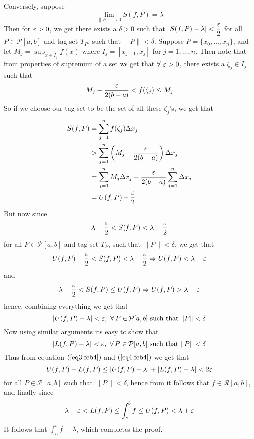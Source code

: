 \begin{prf}
    Conversely, suppose \[ \lim_{\|P\| \to 0} S(f,P) = \lambda \]
    Then for $\varepsilon > 0$, we get there exists a $\delta > 0$ such that $|S(f,P) - \lambda| < \displaystyle{\frac{\varepsilon}{2}}$ for all $P \in \mathcal{P}[a,b]$ and tag set $T_P$, such that $\|P\| < \delta$. Suppose $P = \{x_0, \dots, x_n\}$, and let $M_j = \sup_{x \in I_j} f(x)$ where $I_j = [x_{j-1},x_j]$ for $j = 1, \dots, n$. Then note that from properties of supremum of a set we get that $\forall \ \varepsilon > 0$, there exists a $\zeta_j \in I_j$ such that \[ M_j - \frac{\varepsilon}{2(b-a)} < f(\zeta_j) \leq M_j \] So if we choose our tag set to be the set of all these $\zeta_j$'s, we get that 
    \begin{align*}
        S(f,P) &= \sum_{j=1}^n f(\zeta_j) \Delta x_j \\ 
               &> \sum_{j=1}^n \left(M_j - \frac{\varepsilon}{2(b-a)}\right) \Delta x_j \\ 
               &= \sum_{j=1}^n M_j \Delta x_j - \frac{\varepsilon}{2(b-a)} \sum_{j=1}^n \Delta x_j \\ 
               &= U(f,P) - \frac{\varepsilon}{2}
    \end{align*}
    But now since 
    \[
        \lambda-\frac{\varepsilon}{2} < S(f,P) < \lambda + \frac{\varepsilon}{2}  
    \]
    for all $P \in \mathcal{P}[a,b]$ and tag set $T_P$, such that $\|P\| < \delta$, we get that 
    \[
        U(f,P) - \frac{\varepsilon}{2} < S(f,P) < \lambda + \frac{\varepsilon}{2} \Rightarrow U(f,P) < \lambda + \varepsilon   
    \]
    and 
    \[
        \lambda - \frac{\varepsilon}{2} < S(f,P) \leq U(f,P) \Rightarrow U(f,P) > \lambda - \varepsilon   
    \]
    hence, combining everything we get that 
    \begin{equation}\label{eq3:feb4}
        |U(f,P) - \lambda| < \varepsilon, \ \forall \, P \in \mathcal{P}[a,b] \mbox{ such that } \|P\| < \delta
    \end{equation}
    Now using similar arguments its easy to show that 
    \begin{equation}\label{eq4:feb4}
        |L(f,P) - \lambda| < \varepsilon, \ \forall \, P \in \mathcal{P}[a,b] \mbox{ such that } \|P\| < \delta
    \end{equation}
    Thus from equation $(\ref{eq3:feb4})$ and $(\ref{eq4:feb4})$ we get that 
    \[
        U(f,P) - L(f,P) \leq |U(f,P) - \lambda| + |L(f,P)-\lambda| < 2\varepsilon  
    \] 
    for all $P \in \mathcal{P}[a,b]$ such that $\|P\| < \delta$, hence from  it follows that $f \in \mathcal{R}[a,b]$, and finally since 
    \[ \lambda - \varepsilon < L(f,P) \leq \int_a^b f \leq U(f,P) < \lambda + \varepsilon \]
    It follows that $\int_a^b f = \lambda$, which completes the proof.
\end{prf}

